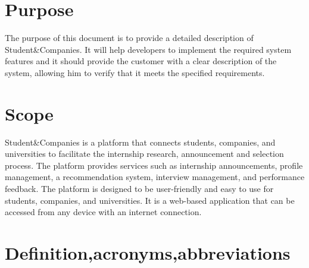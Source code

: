 \renewcommand{\thesection}{\Alph{section}}
\section{Purpose}\label{sec:purpose}
The purpose of this document is to provide a detailed description of Student\&Companies. It will help developers to implement the 
required system features and it should provide the customer with a clear description of the system, allowing him to verify that it
meets the specified requirements.

\section{Scope}\label{sec:scope}
Student\&Companies is a platform that connects students, companies, and universities to facilitate the internship research, announcement and selection 
process. The platform provides services such as internship announcements, profile management, a recommendation system, interview management, and 
performance feedback. The platform is designed to be user-friendly and easy to use for students, companies, and universities. It is a web-based 
application that can be accessed from any device with an internet connection.

\section{Definition,acronyms,abbreviations}\label{sec:definition,acronyms,abbreviations}
